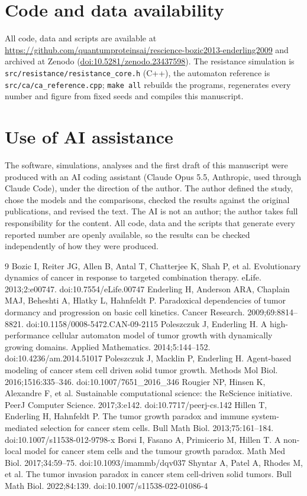 \documentclass[11pt]{article}
\begin{document}
\section*{Code and data availability}
All code, data and scripts are available at
\url{https://github.com/quantumproteinsai/rescience-bozic2013-enderling2009}
and archived at Zenodo (\href{https://doi.org/10.5281/zenodo.23437598}{doi:10.5281/zenodo.23437598}).
The resistance simulation is \nolinkurl{src/resistance/resistance_core.h} (C++), the
automaton reference is \nolinkurl{src/ca/ca_reference.cpp}; \texttt{make all} rebuilds the
programs, regenerates every number and figure from fixed seeds and compiles this manuscript.

\section*{Use of AI assistance}
The software, simulations, analyses and the first draft of this manuscript were produced
with an AI coding assistant (Claude Opus 5.5, Anthropic, used through Claude Code), under
the direction of the author. The author defined the study, chose the models and the
comparisons, checked the results against the original publications, and revised the text.
The AI is not an author; the author takes full responsibility for the content. All code,
data and the scripts that generate every reported number are openly available, so the
results can be checked independently of how they were produced.

\begin{thebibliography}{9}
 Bozic I, Reiter JG, Allen B, Antal T, Chatterjee K, Shah P, et al.
Evolutionary dynamics of cancer in response to targeted combination therapy. eLife.
2013;2:e00747. doi:10.7554/eLife.00747
 Enderling H, Anderson ARA, Chaplain MAJ, Beheshti A, Hlatky L,
Hahnfeldt P. Paradoxical dependencies of tumor dormancy and progression on basic cell
kinetics. Cancer Research. 2009;69:8814--8821. doi:10.1158/0008-5472.CAN-09-2115
 Poleszczuk J, Enderling H. A high-performance cellular automaton
model of tumor growth with dynamically growing domains. Applied Mathematics.
2014;5:144--152. doi:10.4236/am.2014.51017
 Poleszczuk J, Macklin P, Enderling H. Agent-based modeling of
cancer stem cell driven solid tumor growth. Methods Mol Biol. 2016;1516:335--346.
doi:10.1007/7651\_2016\_346
 Rougier NP, Hinsen K, Alexandre F, et al. Sustainable computational
science: the ReScience initiative. PeerJ Computer Science. 2017;3:e142.
doi:10.7717/peerj-cs.142
 Hillen T, Enderling H, Hahnfeldt P. The tumor growth paradox and
immune system-mediated selection for cancer stem cells. Bull Math Biol. 2013;75:161--184.
doi:10.1007/s11538-012-9798-x
 Borsi I, Fasano A, Primicerio M, Hillen T. A non-local model for cancer
stem cells and the tumour growth paradox. Math Med Biol. 2017;34:59--75.
doi:10.1093/imammb/dqv037
 Shyntar A, Patel A, Rhodes M, et al. The tumor invasion paradox in
cancer stem cell-driven solid tumors. Bull Math Biol. 2022;84:139.
doi:10.1007/s11538-022-01086-4
\end{thebibliography}
\end{document}
